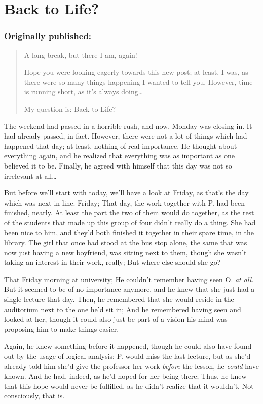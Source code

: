 \chapter{Back to Life?}
\label{cha:back-life}
\subsection*{Originally published: }
\begin{quote}
A long break, but there I am, again!

Hope you were looking eagerly towards this new post; at least, I was, as there were so many things happening I wanted to tell you. However, time is running short, as it's always doing\ldots

My question is: Back to Life?
\end{quote}

The weekend had passed in a horrible rush, and now, Monday was closing in. 
It had already passed, in fact. 
However, there were not a lot of things which had happened that day; at least, nothing of real importance. He thought about everything again, and he realized that everything was as important as one believed it to be. Finally, he agreed with himself that this day was not so irrelevant at all\ldots

But before we'll start with today, we'll have a look at Friday, as that's the day which was next in line. 
Friday; That day, the work together with P. had been finished, nearly. At least the part the two of them would do together, as the rest of the students that made up this group of four didn't really do a thing. She had been nice to him, and they'd both finished it together in their spare time, in the library. The girl that once had stood at the bus stop alone, the same that was now just having a new boyfriend, was sitting next to them, though she wasn't taking an interest in their work, really; But where else should she go?

That Friday morning at university; He couldn't remember having seen O. \emph{at all}. But it seemed to be of no importance anymore, and he knew that she just had a single lecture that day. Then, he remembered that she would reside in the auditorium next to the one he'd sit in; And he remembered having seen and looked at her, though it could also just be part of a vision his mind was proposing him to make things easier.

Again, he knew something before it happened, though he could also have found out by the usage of logical analysis: P. would miss the last lecture, but as she'd already told him she'd give the professor her work \emph{before} the lesson, he \emph{could} have known. And he had, indeed, as he'd hoped for her being there; Thus, he knew that this hope would never be fulfilled, as he didn't realize that it wouldn't. Not consciously, that is.

